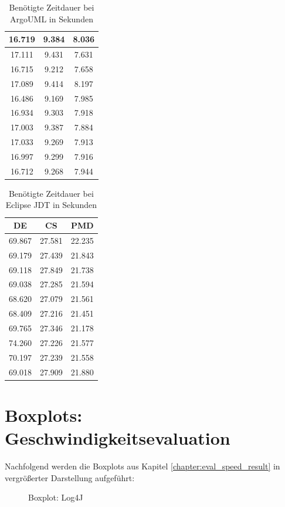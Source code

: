 \begin{appendices}
\begin{table}[]
\begin{tabular}{c|c|c}
16.719&	9.384&	8.036\\\hline
		
17.111&	9.431&	7.631\\\hline
		
16.715&	9.212&	7.658\\\hline
		
17.089&	9.414&	8.197\\\hline
		
16.486&	9.169&	7.985\\\hline
		
16.934&	9.303&	7.918\\\hline
		
17.003&	9.387&	7.884\\\hline
		
17.033&	9.269&	7.913\\\hline
		
16.997&	9.299&	7.916\\\hline
		
16.712&	9.268&	7.944\\\hline
    \end{tabular}
    \caption{Benötigte Zeitdauer bei ArgoUML in Sekunden}
    \label{tab:raw_argo}
\end{table}


\begin{table}[]
    \centering
    \begin{tabular}{c|c|c}
DE & CS &PMD\\\hline
69.867&27.581&22.235\\\hline
69.179&27.439&21.843\\\hline
69.118&27.849&21.738\\\hline
69.038&27.285&21.594\\\hline
68.620&27.079&21.561\\\hline
68.409&27.216&21.451\\\hline
69.765&27.346&21.178\\\hline
74.260&27.226&21.577\\\hline
70.197&27.239&21.558\\\hline
69.018&27.909&21.880\\\hline
    \end{tabular}
    \caption{Benötigte Zeitdauer bei Eclipse JDT in Sekunden}
    \label{tab:raw_eclipse}
\end{table}
\chapter{Boxplots: Geschwindigkeitsevaluation}\label{appendix:boxplots}
Nachfolgend werden die Boxplots aus Kapitel \ref{chapter:eval_speed_result} in vergrößerter Darstellung aufgeführt:
 \begin{figure}[ht!]

    \caption{Boxplot: Log4J}
  

\end{figure}
\end{appendices}
